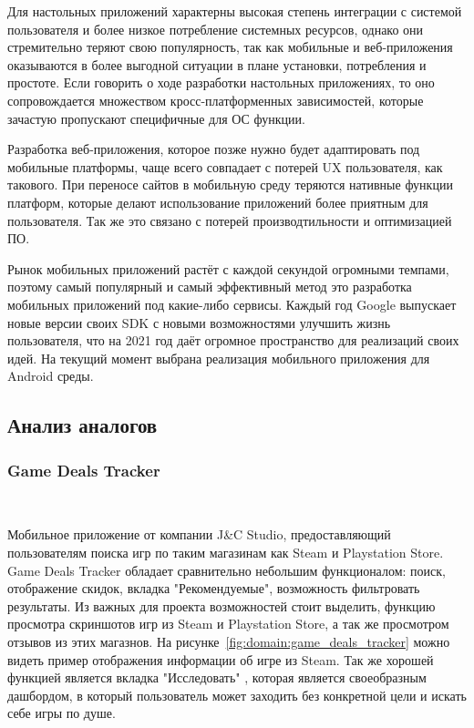 Для настольных приложений характерны высокая степень интеграции с системой пользователя и более низкое потребление системных ресурсов, однако они стремительно теряют свою популярность, так как мобильные и веб-приложения оказываются в более выгодной ситуации в плане установки, потребления и простоте. Если говорить о ходе разработки настольных приложениях, то оно сопровождается множеством кросс-платформенных зависимостей, которые зачастую пропускают специфичные для ОС функции.

Разработка веб-приложения, которое позже нужно будет адаптировать под мобильные платформы, чаще всего совпадает с потерей UX пользователя, как такового. При переносе сайтов в мобильную среду теряются нативные функции платформ, которые делают использование приложений более приятным для пользователя. Так же это связано с потерей производтильности и оптимизацией ПО.

Рынок мобильных приложений растёт с каждой секундой огромными темпами, поэтому самый популярный и самый эффективный метод это разработка мобильных приложений под какие-либо сервисы. Каждый год Google выпускает новые версии своих SDK с новыми возможностями улучшить жизнь пользователя, что на 2021 год даёт огромное пространство для реализаций своих идей. На текущий момент выбрана реализация мобильного приложения для Android среды.

\subsection{Анализ аналогов}

\subsubsection{Game Deals Tracker}~\par
Мобильное приложение от компании J\&C Studio, предоставляющий пользователям поиска игр по таким магазинам как Steam и Playstation Store. Game Deals Tracker обладает сравнительно небольшим функционалом: поиск, отображение скидок, вкладка "Рекомендуемые", возможность фильтровать результаты. Из важных для проекта возможностей стоит выделить, функцию просмотра скриншотов игр из Steam и Playstation Store, а так же просмотром отзывов из этих магазнов. На рисунке~\ref{fig:domain:game_deals_tracker} можно видеть пример отображения информации об игре из Steam. Так же хорошей функцией является вкладка "Исследовать" , которая является своеобразным дашбордом, в который пользователь может заходить без конкретной цели и искать себе игры по душе.
 
